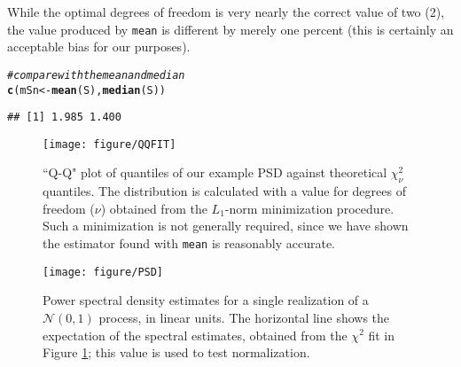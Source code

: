 \documentclass[10pt]{article}\usepackage[]{graphicx}\usepackage[]{color}
\makeatletter
\def\maxwidth{ %
  \ifdim\Gin@nat@width>\linewidth
    \linewidth
  \else
    \Gin@nat@width
  \fi
}
\newcommand{\hlcom}[1]{\textcolor[rgb]{0.678,0.584,0.686}{\textit{#1}}}%
\newcommand{\hlstd}[1]{\textcolor[rgb]{0.345,0.345,0.345}{#1}}%
\newcommand{\hlkwb}[1]{\textcolor[rgb]{0.69,0.353,0.396}{#1}}%
\newcommand{\hlkwd}[1]{\textcolor[rgb]{0.737,0.353,0.396}{\textbf{#1}}}%
\newenvironment{kframe}{%
 \def\at@end@of@kframe{}%
 \ifinner\ifhmode%
  \def\at@end@of@kframe{\end{minipage}}%
  \begin{minipage}{\columnwidth}%
 \fi\fi%
 \def\FrameCommand##1{\hskip\@totalleftmargin \hskip-\fboxsep
 \colorbox{shadecolor}{##1}\hskip-\fboxsep
     \hskip-\linewidth \hskip-\@totalleftmargin \hskip\columnwidth}%
 \MakeFramed {\advance\hsize-\width
   \@totalleftmargin\z@ \linewidth\hsize
   \@setminipage}}%
 {\par\unskip\endMakeFramed%
 \at@end@of@kframe}
\newenvironment{knitrout}{}{} %
\newcommand{\Rcmd}[1]{\texttt{#1}}
\makeatother
\begin{document}
While the optimal degrees of freedom is very nearly the correct value of two (2), 
the value produced by \Rcmd{mean} is different by merely one percent (this is
certainly an acceptable bias for our purposes).
\begin{knitrout}
\color{fgcolor}\begin{kframe}
\begin{alltt}
\hlcom{# compare with the mean and median}
\hlkwd{c}\hlstd{(mSn} \hlkwb{<-} \hlkwd{mean}\hlstd{(S),} \hlkwd{median}\hlstd{(S))}
\end{alltt}
\begin{verbatim}
## [1] 1.985 1.400
\end{verbatim}
\end{kframe}
\end{knitrout}


\begin{figure}[htb!]
\begin{center}
\begin{knitrout}
\color{fgcolor}
\texttt{[image: figure/QQFIT]} 

\end{knitrout}

\caption{``Q-Q" plot of 
quantiles of our example PSD
 against
 theoretical $\chi^2_\nu$ quantiles.  The distribution is calculated
with a value for degrees of freedom ($\nu$) obtained from the
$L_1$-norm minimization procedure.  Such a minimization is not
generally required, since we have shown the estimator found with \Rcmd{mean}
is reasonably accurate.}
\label{fig:qqchi}
\end{center}
\end{figure}

\begin{figure}[htb!]
\begin{center}
\begin{knitrout}
\color{fgcolor}
\texttt{[image: figure/PSD]} 

\end{knitrout}

\caption{Power spectral density estimates for a single realization of a 
$\mathcal{N}(0,1)$ process, in linear units.  
The horizontal line shows the expectation of the spectral estimates, obtained
from the $\chi^2$ fit in Figure \ref{fig:qqchi}; this value is
used to test normalization.}
\label{fig:psdN}
\end{center}
\end{figure}
\end{document}
